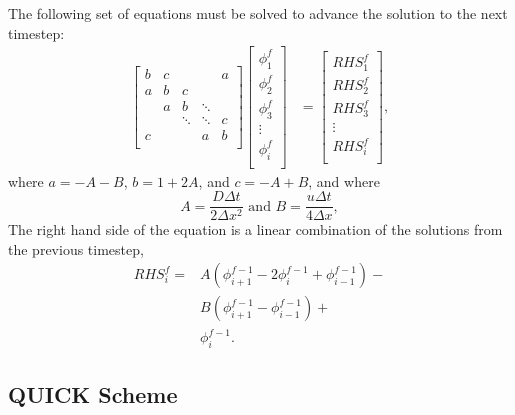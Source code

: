 \documentclass[twocolumn,10pt]{asme2ej}
\begin{document}
The following set of equations must be solved to advance the solution to the next timestep:
\begin{equation}
\begin{split}
\begin{bmatrix}
   { b } & { c } & {   }  & {   }  & { a } \\
   { a } & { b } & { c }  & {   }  & {   } \\
   {   } & { a } & { b }  & \ddots & {   } \\
   {   } & {   } & \ddots & \ddots & { c } \\
   { c } & {   } & {   }  & { a }  & { b } \\
\end{bmatrix}
\begin{bmatrix}
   {\phi_1^{f} }   \\
   {\phi_2^{f} }   \\
   {\phi_3^{f} }   \\
   \vdots   \\
   {\phi_{i}^{f} } \\
\end{bmatrix}
& =
\begin{bmatrix}
   {RHS_1^{f} }   \\
   {RHS_2^{f} }   \\
   {RHS_3^{f} }   \\
   \vdots   \\
   {RHS_{i}^{f} } \\
\end{bmatrix},
\end{split}
\end{equation}
where $a = -A - B$, $b = 1 + 2 A $, and $c = -A + B$, and where
\begin{equation}
A = \frac{D \Delta t }{2 \Delta x^2} \mbox{ and } B = \frac{u \Delta t }{4 \Delta x},
\end{equation}
\noindent The right hand side of the equation is a linear combination of the solutions from the previous timestep,
\begin{equation}
\begin{split}
RHS_i^f = & A (\phi_{i+1}^{f-1} - 2 \phi_i^{f-1} + \phi_{i-1}^{f-1}) - \\
        & B (\phi_{i+1}^{f-1} - \phi_{i-1}^{f-1}) + \\
        & \phi_i^{f-1}.
\end{split}
\end{equation}

\subsection{QUICK Scheme}
\end{document}

